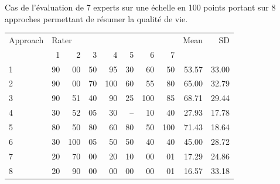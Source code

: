 
Cas de l'évaluation de 7 experts sur une échelle en 100 points portant sur 8
approches permettant de résumer la qualité de vie\autocite{hays05}.

\begin{center}
\footnotesize
\begin{tabular}{lrrrrrrrrr}
  \hline
  Approach & \multicolumn{7}{l}{Rater} & Mean & SD\\
  \cline{2-8}
  & 1 & 2 & 3 & 4 & 5 & 6 & 7 & & \\
  \hline
  1 & 90 & 00 & 50 & 95 & 30 & 60 & 50 & 53.57 & 33.00\\
  2 & 90 & 00 & 70 & 100 & 60 & 55 & 80 & 65.00 & 32.79\\
  3 & 90 & 51 & 40 & 90 & 25 & 100 & 85 & 68.71 & 29.44\\
  4 & 30 & 52 & 05 & 30 & -- & 10 & 40 & 27.93 & 17.78\\
  5 & 80 & 50 & 80 & 60 & 80 & 50 & 100 & 71.43 & 18.64\\
  6 & 30 & 100 & 05 & 50 & 50 & 40 & 40 & 45.00 & 28.72\\
  7 & 20 & 70 & 00 & 20 & 10 & 00 & 01 & 17.29 & 24.86\\
  8 & 20 & 90 & 00 & 00 & 00 & 00 & 01 & 16.57 & 33.18\\
  \hline
\end{tabular}
\end{center}

